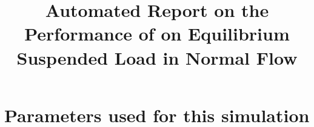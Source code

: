 \documentclass[11pt,a4paper]{article}%
\begin{document}
 

\title{Automated Report on the Performance of \anuga{} on Equilibrium Suspended Load in Normal Flow}
\maketitle




\section{Parameters used for this simulation}






\end{document}
